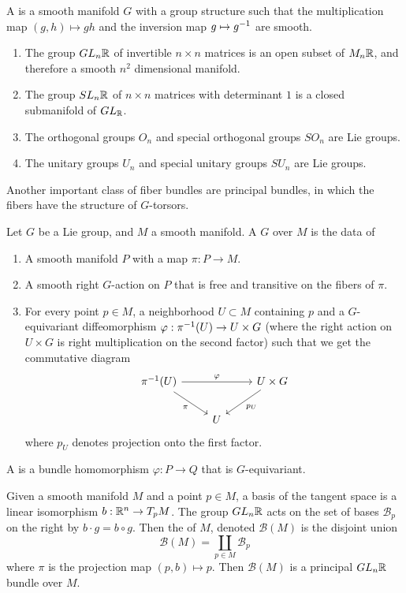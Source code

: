 %
\begin{defn}
A  is a smooth manifold $G$ with a group structure such that the
multiplication map $(g,h) \mapsto gh$ and the inversion map $g \mapsto g^{-1}$
are smooth.
\end{defn}
%
\begin{exmp} \enumbreak
\begin{enumerate}
  \item The group $GL_n\mathbb{R}$ of invertible $n \times n$ matrices is an open
  subset of $M_n\mathbb{R}$, and therefore a smooth $n^2$ dimensional manifold.
  \item The group $SL_n\mathbb{R}$ of $n\times n$ matrices with determinant $1$ is a
  closed submanifold of $GL_{\mathbb{R}}$.
  \item The orthogonal groups $O_n$ and special orthogonal groups $SO_n$ are Lie groups.
  \item The unitary groups $U_n$ and special unitary groups $SU_n$ are Lie groups.
\end{enumerate}
\end{exmp}
%
Another important class of fiber bundles are principal bundles, in which
the fibers have the structure of $G$-torsors.
%
\begin{defn}
Let $G$ be a Lie group, and $M$ a smooth manifold. A  $G$
over $M$ is the data of
%
\begin{enumerate}
  \item A smooth manifold $P$ with a map $\pi : P \to M$.
  \item A smooth right $G$-action on $P$ that is free and transitive on the
  fibers of $\pi$.
  \item For every point $p \in M$, a neighborhood $U \subset M$ containing $p$ and
  a $G$-equivariant diffeomorphism $\varphi: \pi^{-1}(U) \to U \times G$ (where
  the right action on $U \times G$ is right multiplication on the second factor)
  such that we get the commutative diagram
  \[\begin{tikzcd}
  \pi\inv(U) \ar[dr, "\pi"']\ar[rr, "\varphi"]&& U \times G \ar[dl, "p_U"]\\
  & U
  \end{tikzcd}\]
  where $p_U$ denotes projection onto the first factor.
\end{enumerate}
A  is a bundle homomorphism $\varphi : P \to Q$
that is $G$-equivariant.
\end{defn}
%
\begin{exmp}
Given a smooth manifold $M$ and a point $p \in M$, a basis of the
tangent space is a linear isomorphism $b : \mathbb{R}^n \to T_pM$. The group
$GL_n\mathbb{R}$ acts on the set of bases $\mathcal{B}_p$  on the right by
$b \cdot g = b \circ g$. Then the  of $M$, denoted
$\mathcal{B}(M)$ is the disjoint union
\[
\mathcal{B}(M) = \coprod_{p \in M}\mathcal{B}_p
\]
where $\pi$ is the projection map $(p,b) \mapsto p$. Then $\mathcal{B}(M)$
is a principal $GL_n\mathbb{R}$ bundle over $M$.
\end{exmp}
